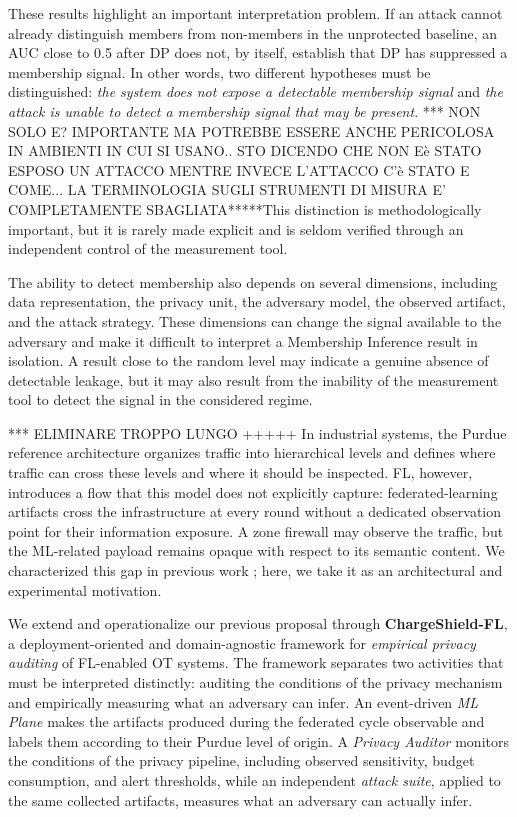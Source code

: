 These results highlight an important interpretation problem. If an attack cannot already distinguish members from non-members in the unprotected baseline, an AUC close to 0.5 after DP does not, by itself, establish that DP has suppressed a membership signal. In other words, two different hypotheses must be distinguished: \textit{the system does not expose a detectable membership signal} and \textit{the attack is unable to detect a membership signal that may be present}. *** NON SOLO E? IMPORTANTE MA POTREBBE ESSERE ANCHE PERICOLOSA IN AMBIENTI IN CUI SI USANO.. STO DICENDO CHE NON Eè STATO ESPOSO UN ATTACCO MENTRE INVECE L'ATTACCO C'è STATO E COME... LA TERMINOLOGIA SUGLI STRUMENTI DI MISURA E' COMPLETAMENTE SBAGLIATA*****This distinction is methodologically important, but it is rarely made explicit and is seldom verified through an independent control of the measurement tool.

The ability to detect membership also depends on several dimensions, including data representation, the privacy unit, the adversary model, the observed artifact, and the attack strategy. These dimensions can change the signal available to the adversary and make it difficult to interpret a Membership Inference result in isolation. A result close to the random level may indicate a genuine absence of detectable leakage, but it may also result from the inability of the measurement tool to detect the signal in the considered regime.

*** ELIMINARE TROPPO LUNGO +++++
In industrial systems, the Purdue reference architecture \cite{williams1994purdue} organizes traffic into hierarchical levels and defines where traffic can cross these levels and where it should be inspected. FL, however, introduces a flow that this model does not explicitly capture: federated-learning artifacts cross the infrastructure at every round without a dedicated observation point for their information exposure. A zone firewall may observe the traffic, but the ML-related payload remains opaque with respect to its semantic content. We characterized this gap in previous work \cite{imperatrice2026toward}; here, we take it as an architectural and experimental motivation.

We extend and operationalize our previous proposal \cite{imperatrice2026toward} through \textbf{ChargeShield-FL}, a deployment-oriented and domain-agnostic framework for \textit{empirical privacy auditing} of FL-enabled OT systems. The framework separates two activities that must be interpreted distinctly: auditing the conditions of the privacy mechanism and empirically measuring what an adversary can infer. An event-driven \textit{ML Plane} makes the artifacts produced during the federated cycle observable and labels them according to their Purdue level of origin. A \textit{Privacy Auditor} monitors the conditions of the privacy pipeline, including observed sensitivity, budget consumption, and alert thresholds, while an independent \textit{attack suite}, applied to the same collected artifacts, measures what an adversary can actually infer.

